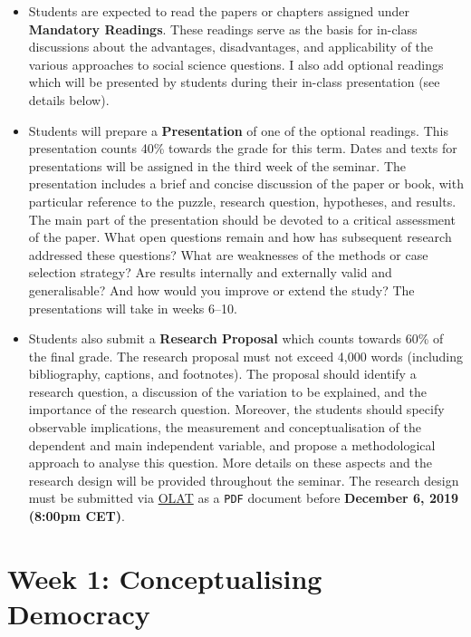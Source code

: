 \documentclass[abstract=on,parskip=full,headings=standardclasses,fontsize=11pt,paper=a4]{scrartcl}
\begin{document}
\begin{itemize}
\item Students are expected to read the papers or chapters assigned under \textbf{Mandatory Readings}. These readings serve as the basis for in-class discussions about the advantages, disadvantages, and applicability of the various approaches to social science questions. I also add optional readings which will be presented by students during their in-class presentation (see details below). 

\item Students will prepare a  \textbf{Presentation} of one of the optional readings. This presentation counts 40\% towards the grade for this term. Dates and texts for presentations will be assigned in the third week of the seminar. The presentation includes a brief and concise discussion of the paper or book, with particular reference to the puzzle, research question, hypotheses, and results. The main part of the presentation should be devoted to a critical assessment of the paper. What open questions remain and how has subsequent research addressed these questions? What are weaknesses of the methods or case selection strategy? Are results internally and externally valid and generalisable? And how would you improve or extend the study? The presentations will take in weeks 6--10.

\item Students also submit a \textbf{Research Proposal} which counts towards 60\% of the final grade. The research proposal must not exceed 4,000 words  (including bibliography, captions, and footnotes).  The proposal  should identify a  research question, a discussion of the variation to be explained, and the importance of the research question. Moreover, the students should specify observable implications, the measurement and conceptualisation of the dependent and main independent variable, and propose a methodological approach to analyse this question. More details on these aspects and the research design will be provided throughout the seminar. The research design must be submitted via \href{https://lms.uzh.ch}{OLAT} as a \texttt{PDF} document before \textbf{December 6, 2019 (8:00pm CET)}. 
\end{itemize}



\newpage

\tableofcontents

\section{Week 1: Conceptualising Democracy}
\end{document}
